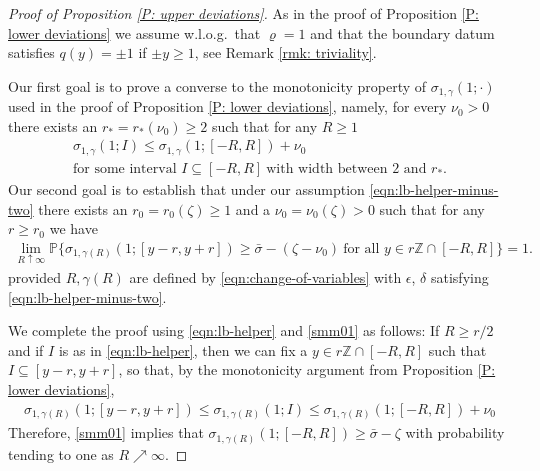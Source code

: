 \documentclass[10pt,a4paper]{amsart}
\begin{document}
\begin{proof}[Proof of Proposition \ref{P: upper deviations}]
		
			As in the proof of Proposition \ref{P: lower deviations} we assume w.l.o.g.~that $ \varrho = 1 $ and that the boundary datum satisfies $ q ( y ) = \pm 1 $ if $ \pm y \geq 1 $, see Remark \ref{rmk: triviality}.
			
			Our first goal is to prove a converse to the monotonicity property of $  \sigma_{ 1 , \gamma } ( 1;  \cdot )  $ used in the proof of Proposition \ref{P: lower deviations}, namely, for every $ \nu_{0} > 0 $ there exists an $ r_{*} = r_{*} ( \nu_{0} )  \geq 2 $ such that for any $ R \geq 1 $
			\begin{gather}
				\sigma_{ 1 , \gamma } ( 1; I ) \leq \sigma_{ 1 , \gamma } ( 1; [ - R , R ] ) + \nu_{0} \label{eqn:lb-helper} \\
				\text{for some interval } I \subseteq [ -R, R ] ~ \text{with width between } 2 \text{ and }  r_{*} . \nonumber
			\end{gather}
			Our second goal is to establish that under our assumption \eqref{eqn:lb-helper-minus-two} there exists an $ r_0 = r_0 ( \zeta ) \geq 1 $ and a $\nu_{0} = \nu_{0} ( \zeta ) > 0$ such that for any $ r \geq r_0 $ we have
			\begin{align}\label{smm01}
				\lim_{ R \uparrow \infty } \mathbb{P} \big\{  \sigma_{ 1 , \gamma(R) } ( 1;  [ y - r , y + r ] ) \geq \bar{\sigma} - (\zeta - \nu_{0}) ~ \text{for all} \, \, y \in r \mathbb{Z} \cap  [- R  , R ] \big\} = 1 .
			\end{align}
			provided $ R, \gamma(R) $ are defined by \eqref{eqn:change-of-variables} with $ \epsilon $, $ \delta $ satisfying \eqref{eqn:lb-helper-minus-two}. 
			
			We complete the proof using \eqref{eqn:lb-helper} and \eqref{smm01} as follows: If $R \geq r/2$ and if $I$ is as in \eqref{eqn:lb-helper}, then we can fix a $y \in r \mathbb{Z} \cap [-R,R]$ such that $ I \subseteq [ y - r , y + r ] $, so that, by the monotonicity argument from Proposition \ref{P: lower deviations},
				\begin{align*}
					\sigma_{1,\gamma(R)}(1;[y-r,y+r]) \leq \sigma_{1,\gamma(R)}(1;I) \leq \sigma_{1,\gamma(R)}(1;[-R,R]) + \nu_{0}
				\end{align*}
		Therefore, \eqref{smm01} implies that $\sigma_{1,\gamma(R)}(1;[-R,R]) \geq \bar{\sigma} - \zeta$ with probability tending to one as $R \nearrow \infty$.
			

\end{proof}
\end{document}

